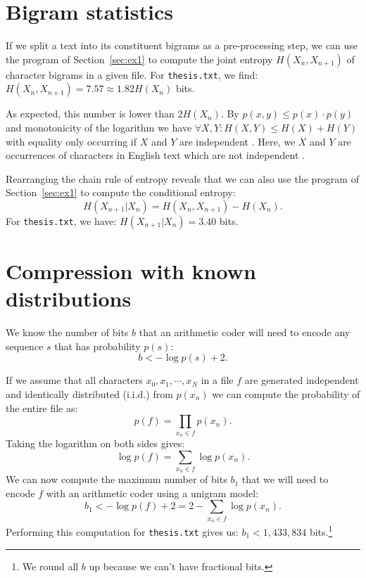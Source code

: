 \documentclass[10pt,a4paper,oneside,onecolumn]{article}
\makeatletter
\newcommand*{\thesisTXT}{{\tt thesis.txt}\xspace}
\newcommand*{\iid}{i.i.d.\@}
\makeatother
\begin{document}
\section{Bigram statistics}\label{sec:ex2}

If we split a text into its constituent bigrams as a pre-processing step, we can
use the program of Section~\ref{sec:ex1} to compute the joint entropy $H(X_n,
X_{n+1})$ of character bigrams in a given file. For \thesisTXT, we
find: $H(X_n, X_{n+1}) = 7.57 \approx 1.82H(X_n)$ bits.\footnotemark
{}

As expected, this number is lower than $2H(X_n)$. By $p(x,y) \le p(x) \cdot
p(y)$ and monotonicity of the logarithm we have $\forall X,Y: H(X, Y) \le H(X) +
H(Y)$ with equality only occurring if $X$ and $Y$ are independent
\cite[p.~138]{mackay}. Here, we $X$ and $Y$ are occurrences of characters in
English text which are not independent \cite[p.~22-24]{mackay}.

Rearranging the chain rule of entropy \cite[p.~139]{mackay} reveals that we can
also use the program of Section~\ref{sec:ex1} to compute the conditional
entropy:
\begin{equation}
    H(X_{n+1} | X_n) = H(X_n, X_{n+1}) - H(X_n).
\end{equation}
For \thesisTXT, we have: $H(X_{n+1} | X_n) = 3.40$ bits.


\section{Compression with known distributions}\label{sec:ex3}

We know \cite[p.~21]{it4} the number of bits $b$ that an arithmetic coder
will need to encode any sequence $s$ that has probability $p(s)$:
\begin{equation}
    b < -\log p(s) + 2.
\end{equation}

If we assume that all characters $x_0, x_1, \cdots, x_N$ in a file $f$ are
generated independent and identically distributed (\iid) from $p(x_n)$ we can
compute the probability of the entire file as:
\begin{equation}
    p(f) = \prod\limits_{x_n \in f} p(x_n).
\end{equation}
Taking the logarithm on both sides gives:
\begin{equation}\label{eq:unigram-logprob}
    \log p(f) = \sum\limits_{x_n \in f} \log p(x_n).
\end{equation}
We can now compute the maximum number of bits $b_1$ that we will need to encode
$f$ with an arithmetic coder using a unigram model:
\begin{equation}\label{eq:unigram-nbits}
    b_1 < -\log p(f) + 2 = 2 - \sum\limits_{x_n \in f} \log p(x_n).
\end{equation}
Performing this computation for \thesisTXT gives us: $b_1 < 1,433,834$
bits.\footnote{We round all $b$ up because we can't have fractional bits.}
\end{document}
